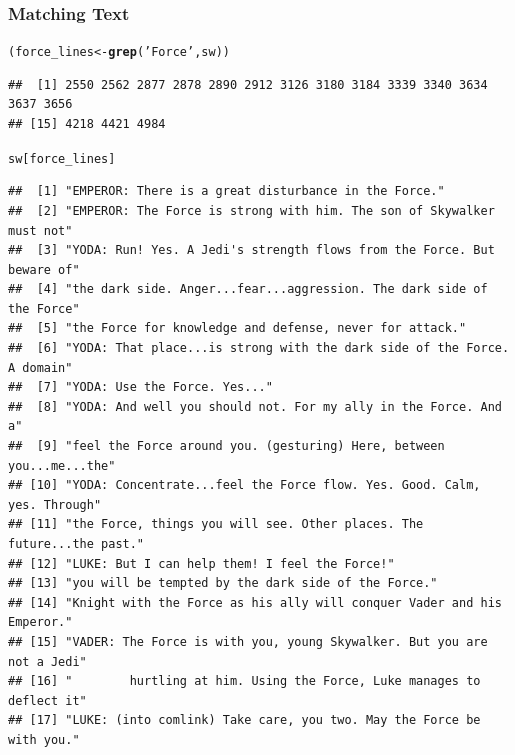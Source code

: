 \documentclass[12pt]{beamer}\usepackage[]{graphicx}\usepackage[]{color}
\makeatletter
\newcommand{\hlstr}[1]{\textcolor[rgb]{0.192,0.494,0.8}{#1}}%
\newcommand{\hlstd}[1]{\textcolor[rgb]{0.345,0.345,0.345}{#1}}%
\newcommand{\hlkwb}[1]{\textcolor[rgb]{0.69,0.353,0.396}{#1}}%
\newcommand{\hlkwd}[1]{\textcolor[rgb]{0.737,0.353,0.396}{\textbf{#1}}}%
\newenvironment{kframe}{%
 \def\at@end@of@kframe{}%
 \ifinner\ifhmode%
  \def\at@end@of@kframe{\end{minipage}}%
  \begin{minipage}{\columnwidth}%
 \fi\fi%
 \def\FrameCommand##1{\hskip\@totalleftmargin \hskip-\fboxsep
 \colorbox{shadecolor}{##1}\hskip-\fboxsep
     \hskip-\linewidth \hskip-\@totalleftmargin \hskip\columnwidth}%
 \MakeFramed {\advance\hsize-\width
   \@totalleftmargin\z@ \linewidth\hsize
   \@setminipage}}%
 {\par\unskip\endMakeFramed%
 \at@end@of@kframe}
\newenvironment{knitrout}{}{} %
\makeatother
\begin{document}

\begin{frame}[fragile]
\frametitle{Matching Text}

\begin{knitrout}\tiny
{}\color{fgcolor}\begin{kframe}
\begin{alltt}
\hlstd{(force_lines} \hlkwb{<-} \hlkwd{grep}\hlstd{(}\hlstr{'Force'}\hlstd{, sw))}
\end{alltt}
\begin{verbatim}
##  [1] 2550 2562 2877 2878 2890 2912 3126 3180 3184 3339 3340 3634 3637 3656
## [15] 4218 4421 4984
\end{verbatim}
\begin{alltt}
\hlstd{sw[force_lines]}
\end{alltt}
\begin{verbatim}
##  [1] "EMPEROR: There is a great disturbance in the Force."                   
##  [2] "EMPEROR: The Force is strong with him. The son of Skywalker must not"  
##  [3] "YODA: Run! Yes. A Jedi's strength flows from the Force. But beware of" 
##  [4] "the dark side. Anger...fear...aggression. The dark side of the Force"  
##  [5] "the Force for knowledge and defense, never for attack."                
##  [6] "YODA: That place...is strong with the dark side of the Force. A domain"
##  [7] "YODA: Use the Force. Yes..."                                           
##  [8] "YODA: And well you should not. For my ally in the Force. And a"        
##  [9] "feel the Force around you. (gesturing) Here, between you...me...the"   
## [10] "YODA: Concentrate...feel the Force flow. Yes. Good. Calm, yes. Through"
## [11] "the Force, things you will see. Other places. The future...the past."  
## [12] "LUKE: But I can help them! I feel the Force!"                          
## [13] "you will be tempted by the dark side of the Force."                    
## [14] "Knight with the Force as his ally will conquer Vader and his Emperor." 
## [15] "VADER: The Force is with you, young Skywalker. But you are not a Jedi" 
## [16] "        hurtling at him. Using the Force, Luke manages to deflect it"  
## [17] "LUKE: (into comlink) Take care, you two. May the Force be with you."
\end{verbatim}
\end{kframe}
\end{knitrout}

\end{frame}
\end{document}
